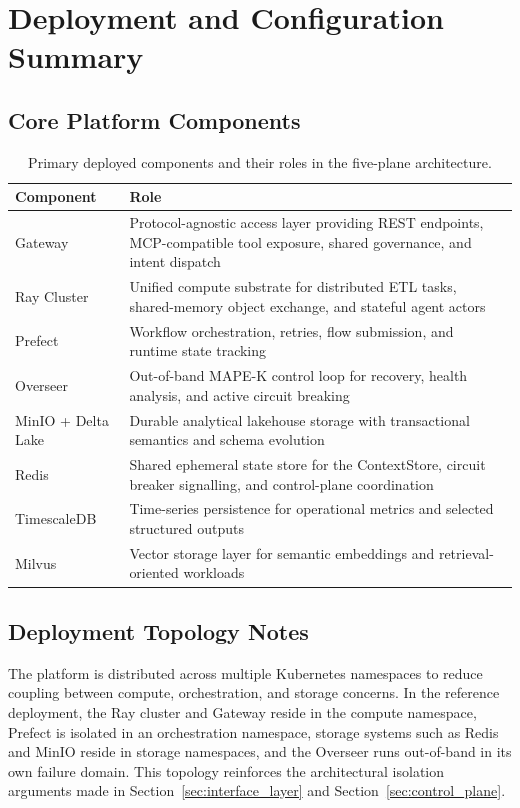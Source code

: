 \documentclass[12pt, a4paper]{report}
\begin{document}
\chapter{Deployment and Configuration Summary}
\label{app:deploy}

\section{Core Platform Components}
\label{app:components}

\begin{table}[H]
  \centering
  \caption{Primary deployed components and their roles in the five-plane architecture.}
  \label{tab:component_roles}
  \begin{tabularx}{\textwidth}{lX}
    \toprule
    \textbf{Component} & \textbf{Role} \\
    \midrule
    Gateway & Protocol-agnostic access layer providing REST endpoints, MCP-compatible tool exposure, shared governance, and intent dispatch \\
    Ray Cluster & Unified compute substrate for distributed ETL tasks, shared-memory object exchange, and stateful agent actors \\
    Prefect & Workflow orchestration, retries, flow submission, and runtime state tracking \\
    Overseer & Out-of-band MAPE-K control loop for recovery, health analysis, and active circuit breaking \\
    MinIO + Delta Lake & Durable analytical lakehouse storage with transactional semantics and schema evolution \\
    Redis & Shared ephemeral state store for the ContextStore, circuit breaker signalling, and control-plane coordination \\
    TimescaleDB & Time-series persistence for operational metrics and selected structured outputs \\
    Milvus & Vector storage layer for semantic embeddings and retrieval-oriented workloads \\
    \bottomrule
  \end{tabularx}
\end{table}

\section{Deployment Topology Notes}
\label{app:topology}

The platform is distributed across multiple Kubernetes namespaces to reduce coupling
between compute, orchestration, and storage concerns. In the reference deployment,
the Ray cluster and Gateway reside in the compute namespace, Prefect is isolated in
an orchestration namespace, storage systems such as Redis and MinIO reside in storage
namespaces, and the Overseer runs out-of-band in its own failure domain. This
topology reinforces the architectural isolation arguments made in
Section~\ref{sec:interface_layer} and Section~\ref{sec:control_plane}.
\end{document}
